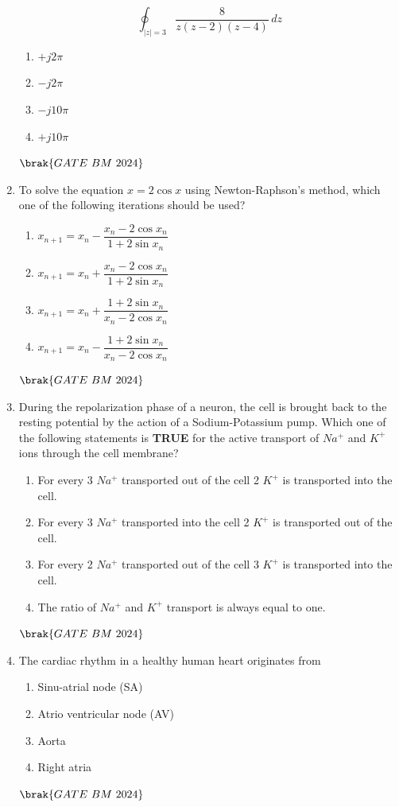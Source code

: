 \documentclass[journal,12pt,onecolumn]{IEEEtran}
\theoremstyle{remark}
\begin{document}
\begin{enumerate}
\[
\oint_{|z|=3} \frac{8}{z(z-2)(z-4)} \, dz
\]

\begin{enumerate}[label=(\Alph*)]
\item $+j2\pi$
\item $-j2\pi$
\item $-j10\pi$
\item $+j10\pi$
\end{enumerate}
\hfill $\brak{GATE\ BM\ 2024}$ 

\item To solve the equation $x = 2\cos x$ using Newton-Raphson's method, which one of the following iterations should be used?

\begin{enumerate}[label=(\Alph*)]
\item $x_{n+1} = x_n - \dfrac{x_n - 2\cos x_n}{1 + 2\sin x_n}$
\item $x_{n+1} = x_n + \dfrac{x_n - 2\cos x_n}{1 + 2\sin x_n}$
\item $x_{n+1} = x_n + \dfrac{1 + 2\sin x_n}{x_n - 2\cos x_n}$
\item $x_{n+1} = x_n - \dfrac{1 + 2\sin x_n}{x_n - 2\cos x_n}$
\end{enumerate}
\hfill $\brak{GATE\ BM\ 2024}$ 

\item During the repolarization phase of a neuron, the cell is brought back to the resting
potential by the action of a Sodium-Potassium pump. Which one of the following
statements is  \textbf{TRUE} for the active transport of $Na^{+}$ and  $K^{+}$ ions through the cell
membrane?
\begin{enumerate}[label=(\Alph*)]
\item For every 3 $Na^{+}$ transported out of the cell 2 $K^{+}$ is transported into the cell.
\item For every 3 $Na^{+}$ transported into the cell 2 $K^{+}$ is transported out of the cell.
\item For every 2 $Na^{+}$ transported out of the cell 3 $K^{+}$ is transported into the cell.
\item The ratio of $Na^{+}$ and $K^{+}$ transport is always equal to one.
\end{enumerate}
\hfill $\brak{GATE\ BM\ 2024}$ 

\item The cardiac rhythm in a healthy human heart originates from  \underline{\hspace{2cm}}
\begin{enumerate}[label=(\Alph*)]
\item Sinu-atrial node (SA)
\item Atrio ventricular node (AV)
\item Aorta
\item Right atria
\end{enumerate}
\hfill $\brak{GATE\ BM\ 2024}$ 


\end{enumerate}
\end{document}
